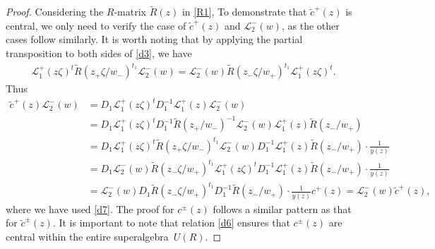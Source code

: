 \documentclass[pdftex]{sigma}
\numberwithin{equation}{section}
\begin{document}
\begin{proof}{Considering the $R$-matrix $\widetilde{R}(z)$ in \eqref{R1},}
To demonstrate that $\widetilde{c}^+(z)$ is central, we only need to verify the case of $\widetilde{c}^+(z)$ and $\mathcal{L}_2^-(w)$, as the other cases follow similarly. It is worth noting that by applying the partial transposition to both sides of \eqref{d3}, we have
 \begin{gather*}
 \mathcal{L}_1^{+}(z\zeta)^t\widetilde{R}(z_+\zeta/w_-)^{t_1}\mathcal{L}_2^{-}(w)=\mathcal{L}_2^{-}(w) \widetilde{R}(z_-\zeta/w_+)^{t_1}\mathcal{L}_1^{+}(z\zeta)^t.
 \end{gather*}Thus
 \begin{align*}\widetilde{c}^+(z)\mathcal{L}_2^{-}(w)&=
 D_1\mathcal{L}_1^{+}(z\zeta)^tD_1^{-1}\mathcal{L}_1^{+}(z)\mathcal{L}_2^-(w)\\
 &= D_1\mathcal{L}_1^{+}(z\zeta)^tD_1^{-1}\widetilde{R}(z_+/w_-)^{-1}\mathcal{L}_2^-(w)\mathcal{L}_1^{+}(z)\widetilde{R}(z_-/w_+)\\
 &=D_1\mathcal{L}_1^{+}(z\zeta)^t\widetilde{R}(z_+\zeta/w_-)^{t_1}\mathcal{L}_2^{-}(w)D_1^{-1}\mathcal{L}_1^{+}(z)\widetilde{R}(z_-/w_+)\cdot\frac{1}{y(z)}\\
 &=D_1\mathcal{L}_2^{-}(w)\widetilde{R}(z_-\zeta/w_+)^{t_1}\mathcal{L}_1^{+}(z\zeta)^tD_1^{-1}\mathcal{L}_1^{+}(z)\widetilde{R}(z_-/w_+)\cdot\frac{1}{y(z)}\\
 &=\mathcal{L}_2^{-}(w)D_1\widetilde{R}(z_-\zeta/w_+)^{t_1}D_1^{-1}\widetilde{R}(z_-/w_+)\cdot\frac{1}{y(z)}c^+(z)=\mathcal{L}_2^{-}(w)\widetilde{c}^+(z),
 \end{align*}
 where we have used \eqref{d7}.
The proof for $c^{\pm}(z)$ follows a similar pattern as that for $\widetilde{c}^{\pm}(z)$. It is important to note that relation \eqref{d6} ensures that $c^{\pm}(z)$ are central within the entire superalgebra~$U(R)$.
\end{proof}
\end{document}
